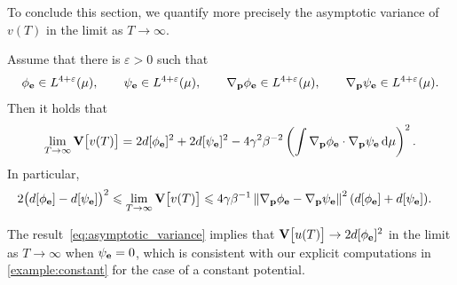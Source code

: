 \documentclass[11pt,a4paper]{article}
\begin{document}
To conclude this section,
we quantify more precisely the asymptotic variance of $v(T)$ in the limit as $T \to \infty$.
\begin{proposition}
    \label{proposition:asymptotic_variance}
    Assume that there is $\varepsilon > 0$ such that
    \begin{equation}
        \label{eq:regularity_solution}
        \phi_{\boldsymbol{\mathbf e}} \in L^{4+\varepsilon}(\mu),
        \qquad
        \psi_{\boldsymbol{\mathbf e}} \in L^{4+\varepsilon}(\mu),
        \qquad
        \nabla_{\boldsymbol{\mathbf p}} \phi_{\boldsymbol{\mathbf e}} \in L^{4+\varepsilon}(\mu),
        \qquad
        \nabla_{\boldsymbol{\mathbf p}} \psi_{\boldsymbol{\mathbf e}} \in L^{4+\varepsilon}(\mu).
    \end{equation}
    Then it holds that
    \begin{equation}
        \label{eq:asymptotic_variance}
        \lim_{T \to \infty} \mathbf{V}\bigl[v(T)\bigr] =
        2 d[\phi_{\boldsymbol{\mathbf e}}]^2 + 2 d[\psi_{\boldsymbol{\mathbf e}}]^2 - 4 \gamma^2 \beta^{-2} \left( \int \nabla_{\boldsymbol{\mathbf p}} \phi_{\boldsymbol{\mathbf e}} \cdot \nabla_{\boldsymbol{\mathbf p}} \psi_{\boldsymbol{\mathbf e}} \, \mathrm d \mu \right)^2.
    \end{equation}
    In particular,
    \begin{align}
        \label{eq:bounds_asymptotic_variance}
        2\bigl( d[\phi_{\vect e}] - d[\psi_{\vect e}] \bigr)^2
        \leq \lim_{T \to \infty} \var \bigl[v(T)\bigr]
        &\leq 4 \gamma \beta^{-1} \norm{\grad_{\vect p} \phi_{\vect e} - \grad_{\vect p} \psi_{\vect e}}^2 (d[\phi_{\vect e}] + d[\psi_{\vect e}]).
    \end{align}
\end{proposition}
\begin{remark}
    The result~\eqref{eq:asymptotic_variance} implies that $\mathbf{V}\bigl[u(T)\bigr] \to 2 d[\phi_{\boldsymbol{\mathbf e}}]^2$ in the limit as $T \to \infty$ when $\psi_{\boldsymbol{\mathbf e}} = 0$,
    which is consistent with our explicit computations in \cref{example:constant} for the case of a constant potential.
\end{remark}
\end{document}
